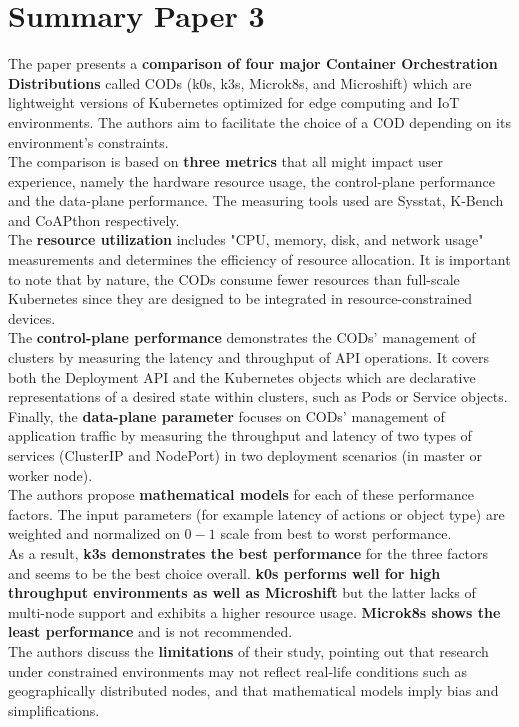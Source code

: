 \section{Summary Paper 3}%
\label{sec:Summary Paper 3}

The paper \cite{} presents a \textbf{comparison of four major Container Orchestration Distributions} called CODs (k0s, k3s, Microk8s, and Microshift) which are lightweight versions of Kubernetes optimized for edge computing and IoT environments. The authors aim to facilitate the choice of a COD depending on its environment's constraints.\\

The comparison is based on \textbf{three metrics} that all might impact user experience, namely the hardware resource usage, the control-plane performance and the data-plane performance. The measuring tools used are Sysstat, K-Bench and CoAPthon respectively. \\
The \textbf{resource utilization} includes "CPU, memory, disk, and network usage" measurements and determines the efficiency of resource allocation. It is important to note that by nature, the CODs consume fewer resources than full-scale Kubernetes since they are designed to be integrated in resource-constrained devices. \\
The \textbf{control-plane performance} demonstrates the CODs' management of clusters by measuring the latency and throughput of API operations. It covers both the Deployment API and the Kubernetes objects which are declarative representations of a desired state within clusters, such as Pods or Service objects.\\
Finally, the \textbf{data-plane parameter} focuses on CODs' management of application traffic by measuring the throughput and latency of two types of services (ClusterIP and NodePort) in two deployment scenarios (in master or worker node). \\

The authors propose \textbf{mathematical models} for each of these performance factors. The input parameters (for example latency of actions or object type) are weighted and normalized on $0-1$ scale from best to worst performance. \\
As a result, \textbf{k3s demonstrates the best performance} for the three factors and seems to be the best choice overall. \textbf{k0s performs well for high throughput environments as well as Microshift} but the latter lacks of multi-node support and exhibits a higher resource usage. \textbf{Microk8s shows the least performance} and is not recommended. \\
The authors discuss the \textbf{limitations} of their study, pointing out that research under constrained environments may not reflect real-life conditions such as geographically distributed nodes, and that mathematical models imply bias and simplifications. 

